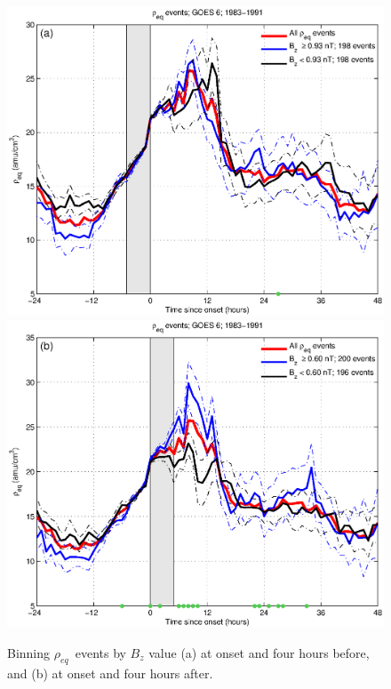 \documentclass[10pt,twocolumn]{article}
\newcommand{\req}{\ensuremath{\rho_{eq}}}
\begin{document}
\begin{figure}[tp!]
	\centering
	\includegraphics[scale=0.40]{figures/RhoBinned/RhoBinnedBz-case24-t020-tf25-GOES6.eps}
	\includegraphics[scale=0.40]{figures/RhoBinned/RhoBinnedBz-case24-t025-tf30-GOES6.eps}
	\caption{Binning \req\ events by $B_z$ value (a) at onset and four hours before, and (b) at onset and four hours after.}
	\label{fig:RhoBinned}
\end{figure}
\end{document}
